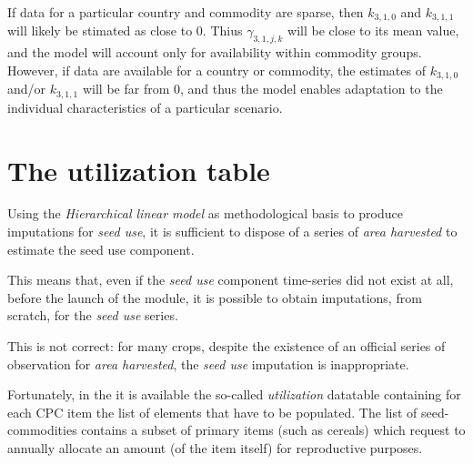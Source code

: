 \documentclass[nojss]{jss}
\begin{document}
If data for a particular country and commodity are sparse, then $k_{3,1,0}$ and $k_{3,1,1}$ will likely be stimated as close to 0. Thius $\gamma_{3,1,j,k}$ will be close to its mean value, and the model will account only for availability within commodity groups. However, if data are available for a country or commodity, the estimates of $k_{3,1,0}$ and/or $k_{3,1,1}$ will be far from 0, and thus the model enables adaptation to the individual characteristics of a particular scenario.

\section{The utilization table}

Using the \textit{Hierarchical linear model} as methodological basis to produce imputations for \textit{seed use}, it is sufficient to dispose of a series of \textit{area harvested} to estimate the {seed use} component.

This means that, even if the \textit{seed use} component time-series did not exist at all, before the launch of the module, it is possible to obtain imputations, from scratch, for the \textit{seed use} series. 

This is not correct: for many crops, despite the existence of an official series of observation for \textit{area harvested}, the \textit{seed use} imputation is inappropriate. 

Fortunately, in the  it is available the so-called \textit{utilization} datatable containing for each CPC item the list of elements that have to be populated. The list of seed-commodities contains a subset of primary items (such as cereals) which request to annually allocate an amount (of the item itself) for reproductive purposes.
\end{document}
